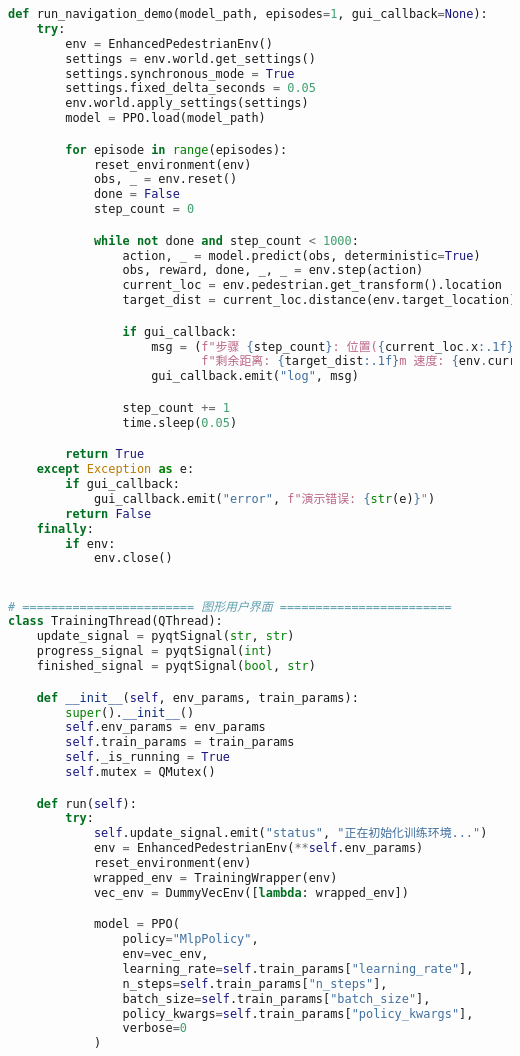 \begin{lstlisting}[language=Python]
def run_navigation_demo(model_path, episodes=1, gui_callback=None):
    try:
        env = EnhancedPedestrianEnv()
        settings = env.world.get_settings()
        settings.synchronous_mode = True
        settings.fixed_delta_seconds = 0.05
        env.world.apply_settings(settings)
        model = PPO.load(model_path)

        for episode in range(episodes):
            reset_environment(env)
            obs, _ = env.reset()
            done = False
            step_count = 0

            while not done and step_count < 1000:
                action, _ = model.predict(obs, deterministic=True)
                obs, reward, done, _, _ = env.step(action)
                current_loc = env.pedestrian.get_transform().location
                target_dist = current_loc.distance(env.target_location)

                if gui_callback:
                    msg = (f"步骤 {step_count}: 位置({current_loc.x:.1f}, {current_loc.y:.1f}) "
                           f"剩余距离: {target_dist:.1f}m 速度: {env.current_speed:.1f}m/s")
                    gui_callback.emit("log", msg)

                step_count += 1
                time.sleep(0.05)

        return True
    except Exception as e:
        if gui_callback:
            gui_callback.emit("error", f"演示错误: {str(e)}")
        return False
    finally:
        if env:
            env.close()


# ======================== 图形用户界面 ========================
class TrainingThread(QThread):
    update_signal = pyqtSignal(str, str)
    progress_signal = pyqtSignal(int)
    finished_signal = pyqtSignal(bool, str)

    def __init__(self, env_params, train_params):
        super().__init__()
        self.env_params = env_params
        self.train_params = train_params
        self._is_running = True
        self.mutex = QMutex()

    def run(self):
        try:
            self.update_signal.emit("status", "正在初始化训练环境...")
            env = EnhancedPedestrianEnv(**self.env_params)
            reset_environment(env)
            wrapped_env = TrainingWrapper(env)
            vec_env = DummyVecEnv([lambda: wrapped_env])

            model = PPO(
                policy="MlpPolicy",
                env=vec_env,
                learning_rate=self.train_params["learning_rate"],
                n_steps=self.train_params["n_steps"],
                batch_size=self.train_params["batch_size"],
                policy_kwargs=self.train_params["policy_kwargs"],
                verbose=0
            )


\end{lstlisting}
